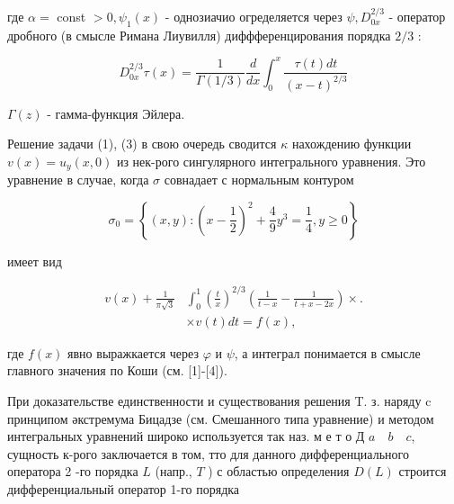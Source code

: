 \documentclass[10pt]{article}
\begin{document}
где $\alpha=$ const $>0, \psi_{1}(x)$ - однозиачио огределяется через $\psi, D_{0 x}^{2 / 3}$ - оператор дробного (в смысле Римана Лиувилля) диффференцирования порядка $2 / 3$ :



\[

D_{0 x}^{2 / 3} \tau(x)=\frac{1}{\Gamma(1 / 3)} \frac{d}{d x} \int_{0}^{x} \frac{\tau(t) d t}{(x-t)^{2 / 3}}

\]



$\Gamma(z)$ - гамма-функция Эйлера.



Решение задачи (1), (3) в свою очередь сводится $\kappa$ нахождению функции $v(x)=u_{y}(x, 0)$ из нек-рого сингулярного интегрального уравнения. Это уравнение в случае, когда $\sigma$ совнадает с нормальным контуром



\[

\sigma_{0}=\left\{(x, y):\left(x-\frac{1}{2}\right)^{2}+\frac{4}{9} y^{3}=\frac{1}{4}, y \geqslant 0\right\}

\]



имеет вид



\[

\begin{aligned}

v(x)+\frac{1}{\pi \sqrt{3}} & \int_{0}^{1}\left(\frac{t}{x}\right)^{2 / 3}\left(\frac{1}{t-x}-\frac{1}{t+x-2 x}\right) \times . \\

& \times v(t) d t=f(x),

\end{aligned}

\]



где $f(x)$ явно выражкается через $\varphi$ и $\psi$, а интеграл понимается в смысле главного значения по Коши (см. [1]-[4]).



При доказательстве единственности и существования решения T. з. наряду $\mathrm{c}$ принципом әкстремума Бицадзе (см. Смешанного типа уравнение) и методом интегральных уравнений широко используется так наз. м е т о Д $a \quad b \quad c$, сущность к-рого заключается в том, тто для данного дифференциального оператора 2 -го порядка $L$ (напр., $T$ ) с областью определения $D(L)$ строится дифференциальный оператор 1-го порядка
\end{document}
